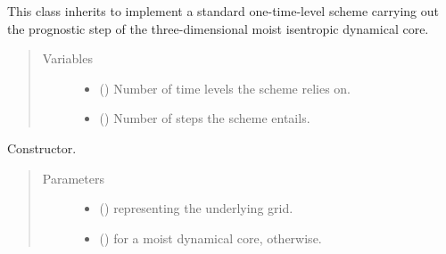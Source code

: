 \documentclass[letterpaper,10pt,english]{sphinxmanual}
\begin{document}

\begin{fulllineitems}
\label{\detokenize{api:dycore.prognostic_isentropic.PrognosticIsentropicTL1}}
This class inherits {\hyperref[\detokenize{api:dycore.prognostic_isentropic.PrognosticIsentropic}]{}} to implement
a standard one-time-level scheme carrying out the prognostic step of the three-dimensional
moist isentropic dynamical core.
\begin{quote}\begin{description}
\item[{Variables}] \leavevmode\begin{itemize}
\item {} 
 () \textendash{} Number of time levels the scheme relies on.

\item {} 
 () \textendash{} Number of steps the scheme entails.

\end{itemize}

\end{description}\end{quote}

\begin{fulllineitems}
\label{\detokenize{api:dycore.prognostic_isentropic.PrognosticIsentropicTL1.__init__}}
Constructor.
\begin{quote}\begin{description}
\item[{Parameters}] \leavevmode\begin{itemize}
\item {} 
 () \textendash{} {\hyperref[\detokenize{api:grids.grid_xyz.GridXYZ}]{}} representing the underlying grid.

\item {} 
 () \textendash{}  for a moist dynamical core,  otherwise.


\end{itemize}
\end{description}
\end{quote}
\end{fulllineitems}
\end{fulllineitems}
\end{document}
